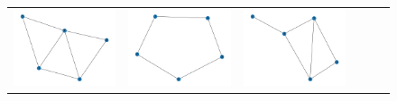 \documentclass[11pt,a4paper,openright,oneside]{book}
\numberwithin{equation}{section}
\begin{document}
{\begin{figure}[h]
\begin{adjustwidth}{-3cm}{-3cm}
\begin{tabular}{>{\centering\arraybackslash}m{1.5cm} m{2.5cm} m{2.5cm} m{2.5cm} m{2.5cm} m{2.5cm}}
        \rule{0pt}{0.01cm} \includegraphics[width=\linewidth]{media/tnale/graph-1-tnale-4.png} \rule{0pt}{0.01cm}&
        \rule{0pt}{0.01cm} \includegraphics[width=\linewidth]{media/tnale/graph-2-tnale-4.png} \rule{0pt}{0.01cm}&
        \rule{0pt}{0.01cm} \includegraphics[width=\linewidth]{media/tnale/graph-3-tnale-4.png} \rule{0pt}{0.01cm}& 

\end{tabular}
\end{adjustwidth}
\end{figure}}
\end{document}

